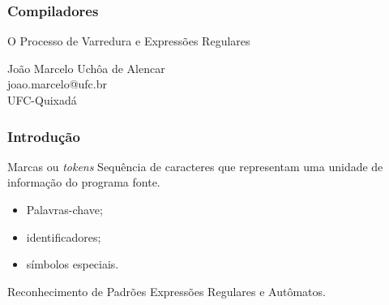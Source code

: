 \documentclass[table]{beamer}
\begin{document}
\begin{frame}
   \frametitle{Compiladores}
   \large
   \begin{center}
      O Processo de Varredura e Expressões Regulares 
   \end{center}
   \scriptsize
   \begin{center}
      João Marcelo Uchôa de Alencar \\
      joao.marcelo@ufc.br \\
      UFC-Quixadá
   \end{center}
\end{frame}

\begin{frame}
   \tableofcontents
\end{frame}

\begin{frame}
   \frametitle{Introdução}
   \begin{block}{Marcas ou \textit{tokens}}
   Sequência de caracteres que representam uma unidade de informação do programa fonte.
   \end{block}
   \begin{itemize}
      \item Palavras-chave;
      \item identificadores;
      \item símbolos especiais.
   \end{itemize}
   \begin{block}{Reconhecimento de Padrões}
   Expressões Regulares e Autômatos.
   \end{block}
\end{frame}
\end{document}
